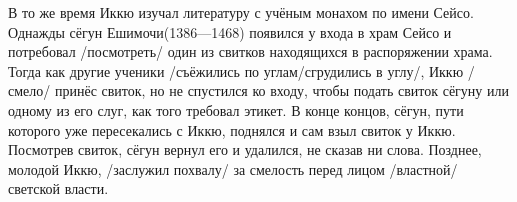 \begin{ver}
В то же время Иккю изучал литературу с учёным монахом по имени
Сейсо. Однажды сёгун
Ешимочи(1386---1468) появился у входа в храм Сейсо и потребовал
/посмотреть/ один
из свитков находящихся в распоряжении храма. Тогда как другие ученики
/съёжились по углам/сгрудились в углу/, Иккю /смело/
принёс свиток, но не спустился ко входу, чтобы подать свиток сёгуну
или одному из его слуг, как того требовал этикет. В конце концов,
сёгун, пути которого уже пересекались с Иккю, поднялся и сам взыл
свиток у Иккю. Посмотрев свиток, сёгун вернул его и удалился, не
сказав ни слова. Позднее, молодой Иккю, /заслужил похвалу/ за смелость
перед лицом /властной/ светской власти. 
\end{ver}

